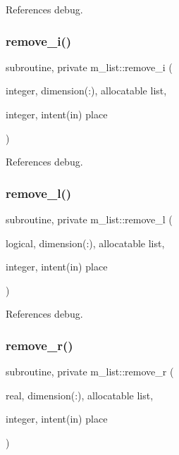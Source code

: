 References debug.

\mbox{\label{namespacem__list_acdc3299515ed0402f4213d76d3e4d4cf}} 
\subsubsection{\texorpdfstring{remove\+\_\+i()}{remove\_i()}}
{\footnotesize\ttfamily subroutine, private m\+\_\+list\+::remove\+\_\+i (\begin{DoxyParamCaption}\item[{integer, dimension(\+:), allocatable}]{list,  }\item[{integer, intent(in)}]{place }\end{DoxyParamCaption})\hspace{0.3cm}{\ttfamily [private]}}



References debug.

\mbox{\label{namespacem__list_a138b6450613db943177df6258f58e89b}} 
\subsubsection{\texorpdfstring{remove\+\_\+l()}{remove\_l()}}
{\footnotesize\ttfamily subroutine, private m\+\_\+list\+::remove\+\_\+l (\begin{DoxyParamCaption}\item[{logical, dimension(\+:), allocatable}]{list,  }\item[{integer, intent(in)}]{place }\end{DoxyParamCaption})\hspace{0.3cm}{\ttfamily [private]}}



References debug.

\mbox{\label{namespacem__list_af5940ed6b39d9e3429e2784767db9e56}} 
\subsubsection{\texorpdfstring{remove\+\_\+r()}{remove\_r()}}
{\footnotesize\ttfamily subroutine, private m\+\_\+list\+::remove\+\_\+r (\begin{DoxyParamCaption}\item[{real, dimension(\+:), allocatable}]{list,  }\item[{integer, intent(in)}]{place }\end{DoxyParamCaption})\hspace{0.3cm}{\ttfamily [private]}}



